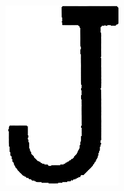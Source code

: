 \documentclass[times, zavrsni, numeric, utf8]{fer}
\begin{document}
\begin{figure}[H]
				\centering
				\begin{subfigure}[b]{0.14\textwidth}
					\centering
					\includegraphics[width=\textwidth]{templates-rank/image23.png}
					\caption{}
				\end{subfigure}
				\begin{subfigure}[b]{0.14\textwidth}
					\centering

\end{subfigure}
\end{figure}
\end{document}
